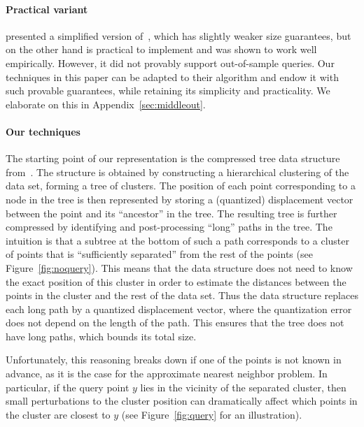\paragraph{Practical variant}
\cite{indyk2017practical} presented a simplified version of~\cite{indyk2017near}, which has slightly weaker size guarantees, but on the other hand is practical to implement and was shown to work well empirically.
However, it did not provably support out-of-sample queries.
Our techniques in this paper can be adapted to their algorithm and endow it with such provable guarantees, while retaining its simplicity and practicality. We elaborate on this in Appendix~\ref{sec:middleout}.

\paragraph{Our techniques}
The starting point of our representation is the compressed tree data structure from~\cite{indyk2017near}.  The structure is obtained by constructing a hierarchical clustering of the data set, forming a tree of clusters.  The position of each point corresponding to a node in the tree is then represented by storing a (quantized) displacement vector between the point and its ``ancestor'' in the tree.
The resulting tree is further compressed by identifying and post-processing ``long'' paths in the tree. 
The intuition is that a subtree at the bottom of such a path corresponds to a cluster of points that is ``sufficiently separated'' from the rest of the points (see Figure~\ref{fig:noquery}). This means that the data structure does not need to know the exact position of this cluster in order to estimate the distances between the points in the cluster and the rest of the data set. Thus the data structure replaces each long path by a quantized displacement vector, where the quantization error does not depend on the length of the path. This ensures that the tree does not have long paths, which bounds its total size. 

Unfortunately, this reasoning breaks down if one of the points  is not known in advance, as it is the case for the approximate nearest neighbor problem. In particular, if the query point $y$ lies in the vicinity of the separated cluster, then small perturbations to the cluster position can dramatically affect which points in the cluster are closest to $y$ (see Figure~\ref{fig:query} for an illustration). 

